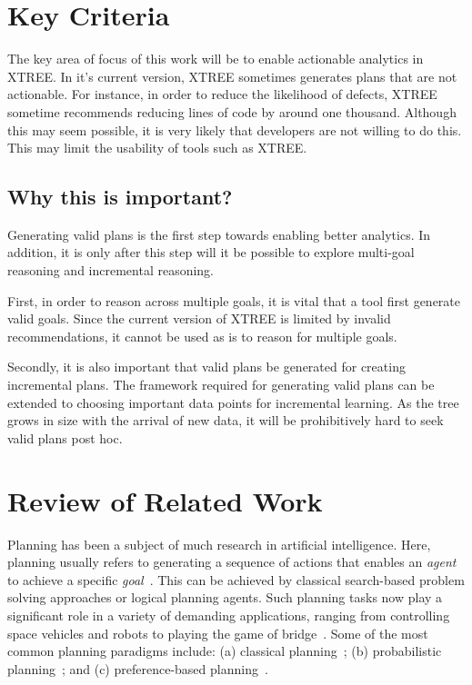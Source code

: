 \documentclass[sigconf, proceedings, 9pt]{acmart}
\begin{document}
\section{Key Criteria}
%

The key area of focus of this work will be to enable actionable analytics in 
XTREE. In it's current version, XTREE sometimes generates plans that are not 
actionable. For instance, in order to reduce the likelihood of defects, XTREE 
sometime recommends reducing lines of code by around one thousand. Although 
this may 
seem possible, it is very likely that developers are not willing to do this. 
This may limit the usability of tools such as XTREE.

\subsection{Why this is important?}

Generating valid plans is the first step towards enabling better analytics. In 
addition, it is only after this step will it be possible to explore multi-goal 
reasoning and incremental reasoning.

First, in order to reason across multiple goals, it is vital that a tool first 
generate valid goals. Since the current version of XTREE is limited by invalid 
recommendations, it cannot be used as is to reason for multiple goals.

Secondly, it is also important that valid plans be generated for creating 
incremental plans. The framework required for generating valid plans can be 
extended to choosing important data points for incremental learning. As the 
tree grows in size with the arrival of new data, it will be prohibitively hard 
to seek valid plans post hoc.

\section{Review of Related Work}

Planning  has been a subject of much research in artificial intelligence. Here, 
planning usually refers to generating a sequence of actions that enables an 
\textit{agent} to achieve a specific \textit{goal}~\cite{norvig}. This can be 
achieved by classical search-based problem solving  approaches or logical 
planning agents. Such planning tasks now play a significant role in a variety 
of demanding applications, ranging from controlling space vehicles and robots 
to playing the game of bridge~\cite{ghallab04}. Some of the most common 
planning paradigms include: (a) classical planning~\cite{wooldridge95}; (b) 
probabilistic planning~\cite{altman99}; and (c) preference-based 
planning~\cite{baier09}. 
\end{document}
